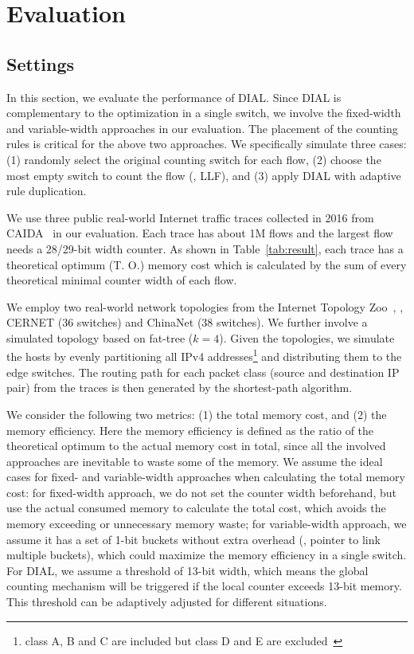 \section{Evaluation}\label{sec:eval}
\subsection{Settings}
In this section, we evaluate the performance of DIAL.
Since DIAL is complementary to the optimization in a single switch, we involve the fixed-width and variable-width approaches in our evaluation.
The placement of the counting rules is critical for the above two approaches.
We specifically simulate three cases:
(1) randomly select the original counting switch for each flow,
(2) choose the most empty switch to count the flow (\ie, LLF), and
(3) apply DIAL with adaptive rule duplication.

We use three public real-world Internet traffic traces collected in 2016 from CAIDA~\cite{CAIDA} in our evaluation.
Each trace has about 1M flows and the largest flow needs a 28/29-bit width counter.
As shown in Table~\ref{tab:result}, each trace has a theoretical optimum (T. O.) memory cost which is calculated by the sum of every theoretical minimal counter width of each flow.

We employ two real-world network topologies from the Internet Topology Zoo~\cite{6027859}, \ie, CERNET (36 switches) and ChinaNet (38 switches).
We further involve a simulated topology based on fat-tree ($k=4$).
Given the topologies, we simulate the hosts by evenly partitioning all IPv4 addresses\footnote{class A, B and C are included but class D and E are excluded~\cite{Classful_network}} and distributing them to the edge switches.
The routing path for each packet class (source and destination IP pair) from the traces is then generated by the shortest-path algorithm.

We consider the following two metrics:
(1) the total memory cost, and
(2) the memory efficiency.
Here the memory efficiency is defined as the ratio of the theoretical optimum to the actual memory cost in total, since all the involved approaches are inevitable to waste some of the memory.
We assume the ideal cases for fixed- and variable-width approaches when calculating the total memory cost:
for fixed-width approach, we do not set the counter width beforehand, but use the actual consumed memory to calculate the total cost, which avoids the memory exceeding or unnecessary memory waste;
for variable-width approach, we assume it has a set of 1-bit buckets without extra overhead (\eg, pointer to link multiple buckets), which could maximize the memory efficiency in a single switch.
For DIAL, we assume a threshold of 13-bit width, which means the global counting mechanism will be triggered if the local counter exceeds 13-bit memory.
This threshold can be adaptively adjusted for different situations.

